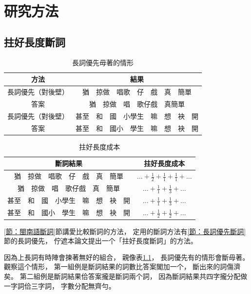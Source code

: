 \chapter{研究方法}
\label{章：研究方法}

\section{拄好長度斷詞}
\label{節：拄好長度斷詞}

\begin{table}
\caption{長詞優先毋著的情形}
\label{表：長詞優先佇一寡例有問題}
\centering
\begin{tabular}{c|c}
方法 & 結果\\
\hline
長詞優先（對後壁） & 猶　掠做　唱歌　仔　戲　真　簡單\\
答案 & 猶　掠做　唱　歌仔戲　真簡單\\
\hline
長詞優先（對後壁） & 甚至　和　國　小學生　嘛　想　袂　開\\
答案 & 甚至　和　國小　學生　嘛　想　袂　開\\
\end{tabular}
\end{table}

\begin{table}
\caption{拄好長度成本}
\label{表：拄好長度成本}
\centering
\begin{tabular}{c|c}
斷詞結果 & 拄好長度成本\\
\hline
猶　掠做　唱歌　仔　戲　真　簡單 & $…+\frac{1}{2}+\frac{1}{1}+\frac{1}{1}+…$\\
猶　掠做　唱　歌仔戲　真　簡單 & $…+\frac{1}{1}+\frac{1}{3}+…$\\
\hline
甚至　和　國　小學生　嘛　想　袂　開 & $…+\frac{1}{1}+\frac{1}{3}+…$\\
甚至　和　國小　學生　嘛　想　袂　開 & $…+\frac{1}{2}+\frac{1}{2}+…$\\
\end{tabular}
\end{table}

\ref{節：閩南語斷詞}節講愛比較斷詞的方法，
定用的斷詞方法有\ref{節：長詞優先斷詞}節的長詞優先，
佇遮本論文提出一个「拄好長度斷詞」的方法。


因為上長詞有時陣會揀著無好的組合，
親像表\ref{表：長詞優先佇一寡例有問題}，
長詞優先有的情形會斷毋著。
觀察這个情形，
第一組例是斷詞結果的詞數比答案閣加一个，
斷出來的詞傷濟矣。
第二組例是斷詞結果佮答案攏是斷詞兩个詞，
因為斷詞結果共四字攏分配做一字詞佮三字詞，
字數分配無齊勻。

